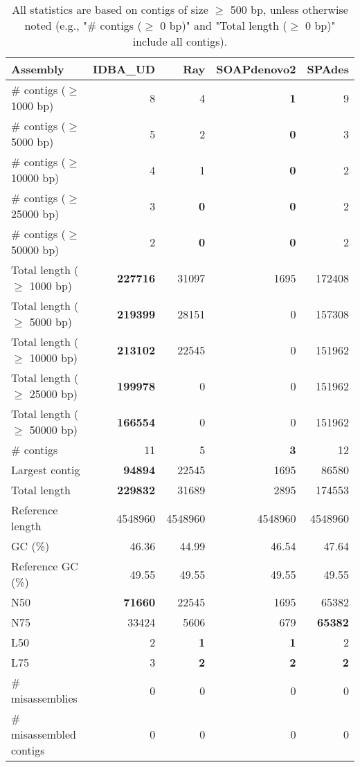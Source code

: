 \documentclass[12pt,a4paper]{article}
\begin{document}
\begin{table}[ht]
\begin{center}
\caption{All statistics are based on contigs of size $\geq$ 500 bp, unless otherwise noted (e.g., "\# contigs ($\geq$ 0 bp)" and "Total length ($\geq$ 0 bp)" include all contigs).}
\begin{tabular}{|l*{4}{|r}|}
\hline
Assembly & IDBA\_UD & Ray & SOAPdenovo2 & SPAdes \\ \hline
\# contigs ($\geq$ 1000 bp) & 8 & 4 & {\bf 1} & 9 \\ \hline
\# contigs ($\geq$ 5000 bp) & 5 & 2 & {\bf 0} & 3 \\ \hline
\# contigs ($\geq$ 10000 bp) & 4 & 1 & {\bf 0} & 2 \\ \hline
\# contigs ($\geq$ 25000 bp) & 3 & {\bf 0} & {\bf 0} & 2 \\ \hline
\# contigs ($\geq$ 50000 bp) & 2 & {\bf 0} & {\bf 0} & 2 \\ \hline
Total length ($\geq$ 1000 bp) & {\bf 227716} & 31097 & 1695 & 172408 \\ \hline
Total length ($\geq$ 5000 bp) & {\bf 219399} & 28151 & 0 & 157308 \\ \hline
Total length ($\geq$ 10000 bp) & {\bf 213102} & 22545 & 0 & 151962 \\ \hline
Total length ($\geq$ 25000 bp) & {\bf 199978} & 0 & 0 & 151962 \\ \hline
Total length ($\geq$ 50000 bp) & {\bf 166554} & 0 & 0 & 151962 \\ \hline
\# contigs & 11 & 5 & {\bf 3} & 12 \\ \hline
Largest contig & {\bf 94894} & 22545 & 1695 & 86580 \\ \hline
Total length & {\bf 229832} & 31689 & 2895 & 174553 \\ \hline
Reference length & 4548960 & 4548960 & 4548960 & 4548960 \\ \hline
GC (\%) & 46.36 & 44.99 & 46.54 & 47.64 \\ \hline
Reference GC (\%) & 49.55 & 49.55 & 49.55 & 49.55 \\ \hline
N50 & {\bf 71660} & 22545 & 1695 & 65382 \\ \hline
N75 & 33424 & 5606 & 679 & {\bf 65382} \\ \hline
L50 & 2 & {\bf 1} & {\bf 1} & 2 \\ \hline
L75 & 3 & {\bf 2} & {\bf 2} & {\bf 2} \\ \hline
\# misassemblies & 0 & 0 & 0 & 0 \\ \hline
\# misassembled contigs & 0 & 0 & 0 & 0 \\ \hline

\end{tabular}
\end{center}
\end{table}
\end{document}

